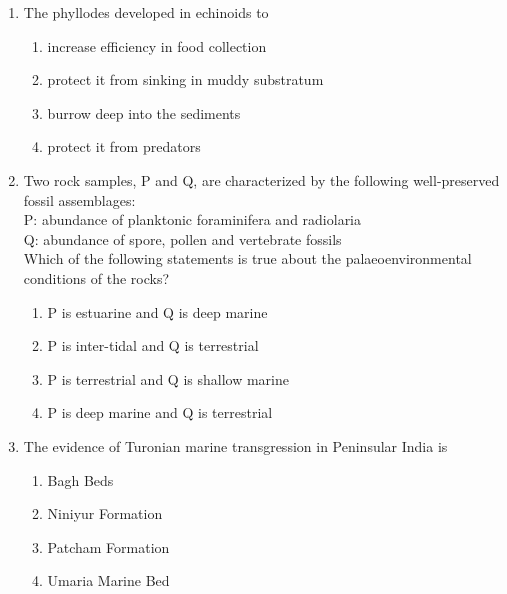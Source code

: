 \documentclass[journal,12pt,onecolumn]{IEEEtran}
\theoremstyle{remark}
\begin{document}
\begin{enumerate}
    \item The phyllodes developed in echinoids to

    \hfill{}
    
    \begin{multicols}{1}
        \begin{enumerate}
            \item increase efficiency in food collection
            \item protect it from sinking in muddy substratum
            \item burrow deep into the sediments
            \item protect it from predators
        \end{enumerate}
    \end{multicols}

    \item Two rock samples, P and Q, are characterized by the following well-preserved fossil assemblages: \\
    P: abundance of planktonic foraminifera and radiolaria \\
    Q: abundance of spore, pollen and vertebrate fossils \\
    Which of the following statements is true about the palaeoenvironmental conditions of the rocks?

    \hfill{}
    
    \begin{multicols}{1}
        \begin{enumerate}
            \item P is estuarine and Q is deep marine
            \item P is inter-tidal and Q is terrestrial
            \item P is terrestrial and Q is shallow marine
            \item P is deep marine and Q is terrestrial
        \end{enumerate}
    \end{multicols}

    \item The evidence of Turonian marine transgression in Peninsular India is

    \hfill{}
    
    \begin{multicols}{2}
        \begin{enumerate}
            \item Bagh Beds
            \item Niniyur Formation
            \item Patcham Formation
            \item Umaria Marine Bed
        \end{enumerate}
    \end{multicols}


\end{enumerate}
\end{document}

